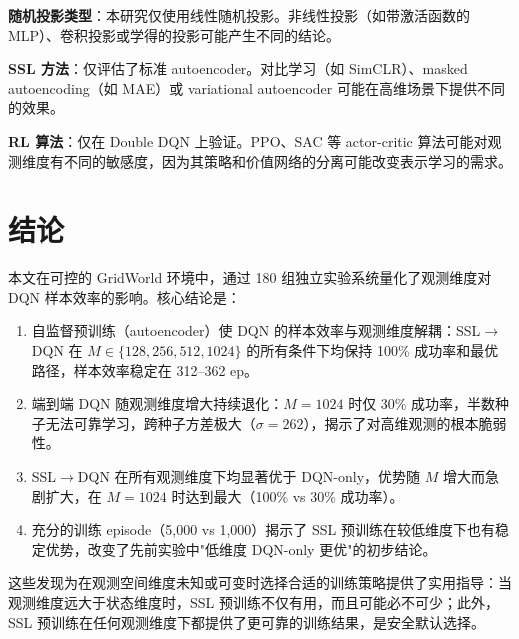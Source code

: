 \documentclass[11pt,a4paper]{ctexart}
\begin{document}
\textbf{随机投影类型}：本研究仅使用线性随机投影。非线性投影（如带激活函数的 MLP）、卷积投影或学得的投影可能产生不同的结论。

\textbf{SSL 方法}：仅评估了标准 autoencoder。对比学习（如 SimCLR）、masked autoencoding（如 MAE）或 variational autoencoder 可能在高维场景下提供不同的效果。

\textbf{RL 算法}：仅在 Double DQN 上验证。PPO、SAC 等 actor-critic 算法可能对观测维度有不同的敏感度，因为其策略和价值网络的分离可能改变表示学习的需求。

\section{结论}

本文在可控的 GridWorld 环境中，通过 180 组独立实验系统量化了观测维度对 DQN 样本效率的影响。核心结论是：

\begin{enumerate}
\item 自监督预训练（autoencoder）使 DQN 的样本效率与观测维度解耦：SSL$\to$DQN 在 $M \in \{128, 256, 512, 1024\}$ 的所有条件下均保持 100\% 成功率和最优路径，样本效率稳定在 312--362 ep。
\item 端到端 DQN 随观测维度增大持续退化：$M=1024$ 时仅 30\% 成功率，半数种子无法可靠学习，跨种子方差极大（$\sigma=262$），揭示了对高维观测的根本脆弱性。
\item SSL$\to$DQN 在所有观测维度下均显著优于 DQN-only，优势随 $M$ 增大而急剧扩大，在 $M=1024$ 时达到最大（100\% vs 30\% 成功率）。
\item 充分的训练 episode（5,000 vs 1,000）揭示了 SSL 预训练在较低维度下也有稳定优势，改变了先前实验中"低维度 DQN-only 更优"的初步结论。
\end{enumerate}

这些发现为在观测空间维度未知或可变时选择合适的训练策略提供了实用指导：当观测维度远大于状态维度时，SSL 预训练不仅有用，而且可能必不可少；此外，SSL 预训练在任何观测维度下都提供了更可靠的训练结果，是安全默认选择。
\end{document}
